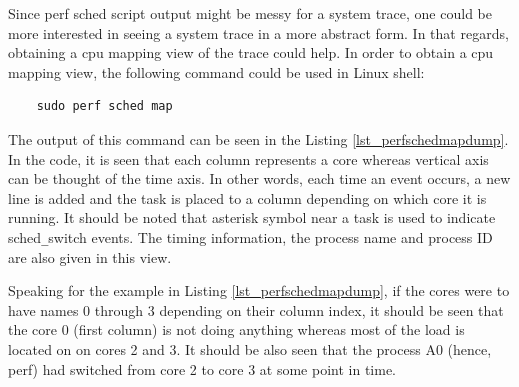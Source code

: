 \begin{itemize}
	Since perf sched script output might be messy for a system trace, one could be more interested in seeing a system trace in a more abstract form. In that regards, obtaining a cpu mapping view of the trace could help. In order to obtain a cpu mapping view, the following command could be used in Linux shell:
	\begin{lstlisting}
	sudo perf sched map
	\end{lstlisting}
	The output of this command can be seen in the Listing \ref{lst_perfschedmapdump}. In the code, it is seen that each column represents a core whereas vertical axis can be thought of the time axis. In other words, each time an event occurs, a new line is added and the task is placed to a column depending on which core it is running. It should be noted that asterisk symbol near a task is used to indicate sched\texttt{\_}switch events. The timing information, the process name and process ID are also given in this view. 
	
	Speaking for the example in Listing \ref{lst_perfschedmapdump}, if the cores were to have names 0 through 3 depending on their column index, it should be seen that the core 0 (first column) is not doing anything whereas most of the load is located on on cores 2 and 3. It should be also seen that the process A0 (hence, perf) had switched from core 2 to core 3 at some point in time.
	

\end{itemize}
